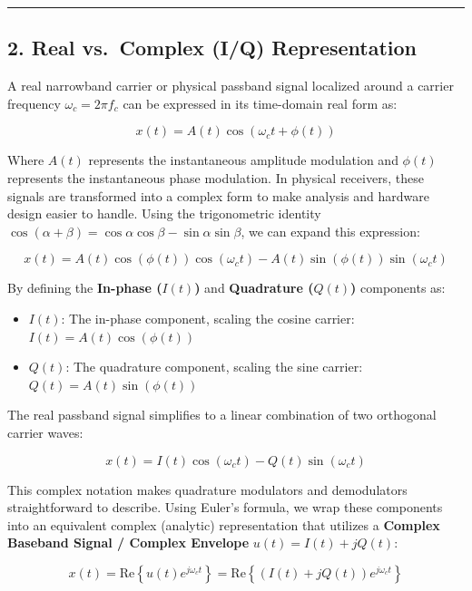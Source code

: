 \documentclass[
]{article}
\providecommand{\tightlist}{%
  \setlength{\itemsep}{0pt}\setlength{\parskip}{0pt}}
\begin{document}
\begin{center}\rule{0.5\linewidth}{0.5pt}\end{center}

\subsection{2. Real vs.~Complex (I/Q)
Representation}\label{real-vs.-complex-iq-representation}

A real narrowband carrier or physical passband signal localized around a
carrier frequency \(\omega_c = 2\pi f_c\) can be expressed in its
time-domain real form as:

\[x(t) = A(t) \cos(\omega_c t + \phi(t))\]

Where \(A(t)\) represents the instantaneous amplitude modulation and
\(\phi(t)\) represents the instantaneous phase modulation. In physical
receivers, these signals are transformed into a complex form to make
analysis and hardware design easier to handle. Using the trigonometric
identity
\(\cos(\alpha + \beta) = \cos\alpha\cos\beta - \sin\alpha\sin\beta\), we
can expand this expression:

\[x(t) = A(t)\cos(\phi(t))\cos(\omega_c t) - A(t)\sin(\phi(t))\sin(\omega_c t)\]

By defining the \textbf{In-phase (\(I(t)\))} and \textbf{Quadrature
(\(Q(t)\))} components as:

\begin{itemize}
\tightlist
\item
  \textbf{\(I(t)\)}: The in-phase component, scaling the cosine carrier:
  \(I(t) = A(t)\cos(\phi(t))\)
\item
  \textbf{\(Q(t)\)}: The quadrature component, scaling the sine carrier:
  \(Q(t) = A(t)\sin(\phi(t))\)
\end{itemize}

The real passband signal simplifies to a linear combination of two
orthogonal carrier waves:

\[x(t) = I(t)\cos(\omega_c t) - Q(t)\sin(\omega_c t)\]

This complex notation makes quadrature modulators and demodulators
straightforward to describe. Using Euler's formula, we wrap these
components into an equivalent complex (analytic) representation that
utilizes a \textbf{Complex Baseband Signal / Complex Envelope}
\(u(t) = I(t) + jQ(t)\):

\[x(t) = \text{Re}\left\{ u(t) e^{j\omega_c t} \right\} = \text{Re}\left\{ (I(t) + jQ(t)) e^{j \omega_c t} \right\}\]
\end{document}
